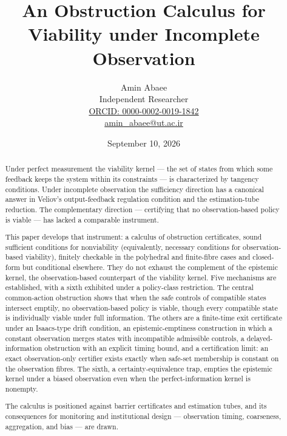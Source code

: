 \documentclass[11pt]{article}
\theoremstyle{definition}
\begin{document}
\title{An Obstruction Calculus for Viability under Incomplete Observation}
\author{Amin Abaee\\[0.35em]
{\small Independent Researcher}\\[0.55em]
{\small\href{https://orcid.org/0000-0002-0019-1842}{ORCID: 0000-0002-0019-1842}}\\[0.3em]
{\small\href{mailto:amin\_abaee@ut.ac.ir}{amin\_abaee@ut.ac.ir}}}
\date{September 10, 2026}
\maketitle

\begin{abstract}

Under perfect measurement the viability kernel --- the set of states
from which some feedback keeps the system within its constraints --- is
characterized by tangency conditions. Under incomplete observation the
sufficiency direction has a canonical answer in Veliov's
output-feedback regulation condition and the estimation-tube reduction.
The complementary direction --- certifying that no observation-based
policy is viable --- has lacked a comparable instrument.

This paper develops that instrument: a calculus of obstruction
certificates, sound sufficient conditions for nonviability (equivalently,
necessary conditions for observation-based viability), finitely
checkable in the polyhedral and finite-fibre cases and closed-form but
conditional elsewhere. They do not exhaust the complement of the
epistemic kernel, the observation-based counterpart of the viability
kernel. Five mechanisms are established, with a sixth exhibited under a
policy-class restriction. The central common-action obstruction shows
that when the safe controls of compatible states intersect emptily, no
observation-based policy is viable, though every compatible state is
individually viable under full information. The others are a finite-time
exit certificate under an Isaacs-type drift condition, an
epistemic-emptiness construction in which a constant observation merges
states with incompatible admissible controls, a delayed-information
obstruction with an explicit timing bound, and a certification limit:
an exact observation-only certifier exists exactly when safe-set
membership is constant on the observation fibres. The sixth, a
certainty-equivalence trap, empties the epistemic kernel under a biased
observation even when the perfect-information kernel is nonempty.

The calculus is positioned against barrier certificates and estimation
tubes, and its consequences for monitoring and institutional design ---
observation timing, coarseness, aggregation, and bias --- are drawn.

\end{abstract}
\end{document}

